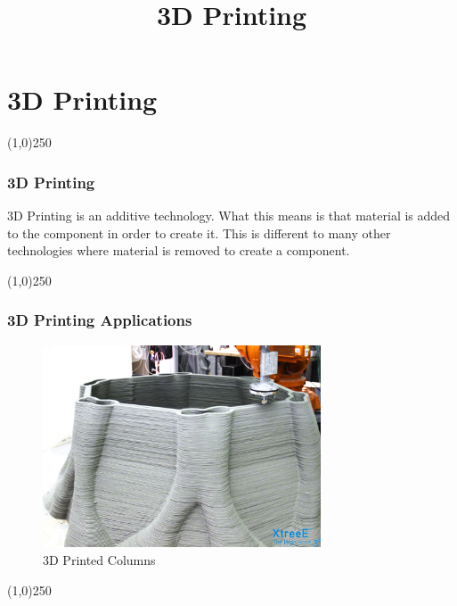 \section{3D Printing}
\begin{frame}
\title[3D Printing]{3D Printing}
\titlepage
\end{frame}\begin{center}\line(1,0){250}\end{center}

\begin{frame}
\frametitle{3D Printing}
3D Printing is an additive technology.  What this means is that material is added to the component in order to create it.  This is different to many other technologies where material is removed to create a component.

\end{frame}
\begin{center}\line(1,0){250}\end{center}


\begin{frame}
\frametitle{3D Printing Applications}
\begin{figure}[h]
	\centering
	\includegraphics[height=6cm]{img/3DPrinting/3dprintedColumn.jpg}
	\caption[3D Printed Columns]{3D Printed Columns}
	\label{fig:3dprintcolumn}
\end{figure}
\end{frame}
\begin{center}\line(1,0){250}\end{center}


